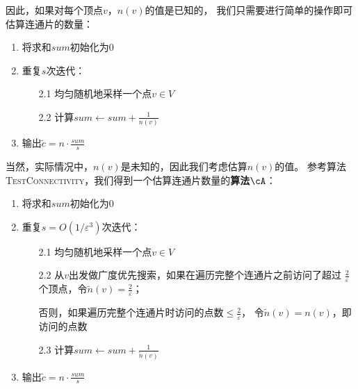 因此，如果对每个顶点$v$，$n(v)$的值是已知的，
我们只需要进行简单的操作即可估算连通片的数量：
\begin{enumerate}
    \item 将求和$sum$初始化为0
    \item 重复$s$次迭代：
    \begin{enumerate}
        \item[2.1] 均匀随机地采样一个点$v\in V$
        \item[2.2] 计算$sum\leftarrow sum+\frac{1}{n(v)}$
    \end{enumerate}
    \item 输出$\tilde{c}=n\cdot\frac{sum}{s}$
\end{enumerate}

当然，实际情况中，$n(v)$是未知的，因此我们考虑估算$n(v)$的值。
参考算法\textsc{TestConnectivity}，我们得到一个估算连通片数量的\textbf{算法}$\cA$：
\begin{enumerate}
    \item 将求和$sum$初始化为0
    \item 重复$s=O(1/\varepsilon^3)$次迭代：
    \begin{enumerate}
        \item[2.1] 均匀随机地采样一个点$v\in V$
        \item[2.2] 从$v$出发做广度优先搜索，如果在遍历完整个连通片之前访问了超过
        $\frac{2}{\varepsilon}$个顶点，令$\tilde{n}(v)=\frac{2}{\varepsilon}$；
        
        否则，如果遍历完整个连通片时访问的点数$\le\frac{2}{\varepsilon}$，
        令$\tilde{n}(v)=n(v)$，即访问的点数
        \item[2.3] 计算$sum\leftarrow sum+\frac{1}{\tilde{n}(v)}$
    \end{enumerate}
    \item 输出$\tilde{c}=n\cdot\frac{sum}{s}$
\end{enumerate}

